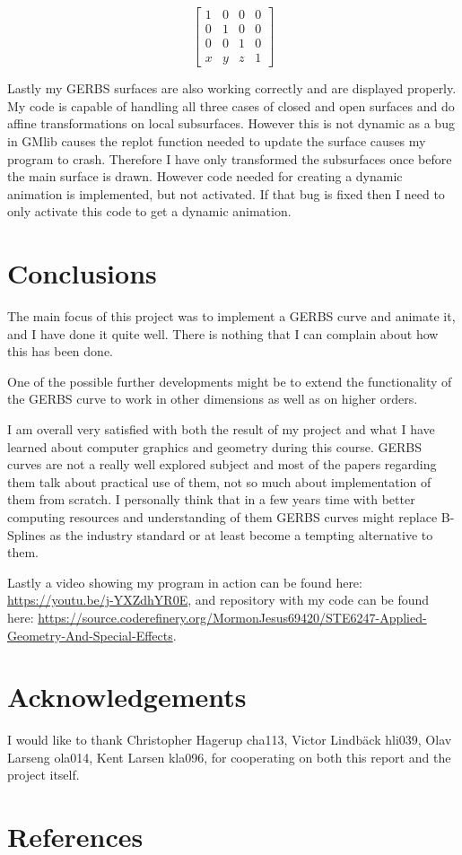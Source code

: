 \documentclass[a4paper,12pt]{extarticle}
\begin{document}
\begin{equation}
\begin{bmatrix}
1&0&0&0\\
0&1&0&0\\
0&0&1&0\\
x&y&z&1
\end{bmatrix}
\label{eq:TranslationMatrix}
\end{equation}

Lastly my GERBS surfaces are also working correctly and are displayed properly. My code is capable of handling all three cases of closed and open surfaces and do affine transformations on local subsurfaces. However this is not dynamic as a bug in GMlib causes the replot function needed to update the surface causes my program to crash. Therefore I have only transformed the subsurfaces once before the main surface is drawn. However code needed for creating a dynamic animation is implemented, but not activated. If that bug is fixed then I need to only activate this code to get a dynamic animation.

\section{Conclusions}
The main focus of this project was to implement a GERBS curve and animate it, and I have done it quite well. There is nothing that I can complain about how this has been done.

One of the possible further developments might be to extend the functionality of the GERBS curve to work in other dimensions as well as on higher orders.

I am overall very satisfied with both the result of my project and what I have learned about computer graphics and geometry during this course. GERBS curves are not a really well explored subject and most of the papers regarding them talk about practical use of them, not so much about implementation of them from scratch. I personally think that in a few years time with better computing resources and understanding of them GERBS curves might replace B-Splines as the industry standard or at least become a tempting alternative to them.

Lastly a video showing my program in action can be found here: \url{https://youtu.be/j-YXZdhYR0E}, and repository with my code can be found here: \url{https://source.coderefinery.org/MormonJesus69420/STE6247-Applied-Geometry-And-Special-Effects}.

\section{Acknowledgements}
I would like to thank Christopher Hagerup cha113, Victor Lindb\"{a}ck hli039, Olav Larseng ola014, Kent Larsen kla096, for cooperating on both this report and the project itself.
 
\section{References}
\begingroup
\def\section*#1{}


\endgroup
\end{document}
